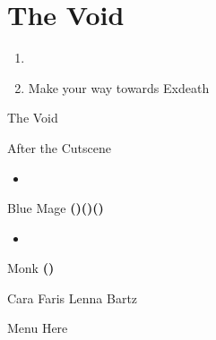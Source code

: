 \chapter{The Void}

\vspace{\baselineskip}

\begin{paracol}{2}

\begin{enumerate}
    \item {}
    \item Make your way towards Exdeath
\end{enumerate}

\switchcolumn
\begin{steproute}{The Void}
\end{steproute}

\switchcolumn*
\begin{menu}{After the Cutscene}
	\varwb
    \begin{abilityMenu}
        \bartz \ability{!\gilToss} \optimize
        \lenna \ability{!\cover} 
        \begin{itemize}
            \item[] \equip{\knife, \crystalShield}
        \end{itemize}
    \end{abilityMenu}
    \begin{jobMenu}
        \faris Blue Mage \textbf{(\pointDown)(\pointLeft)(\pointDown)} \ability{\combine} 
        \begin{itemize}
            \item[] \equip{\runningShoes}
        \end{itemize} 
        \cara Monk \textbf{(\pointRight)} \ability{!\gilToss} \optimize
    \end{jobMenu}
    \begin{rowMenu}
        \swap Cara \switch Faris
        \swap Lenna \switch Bartz
    \end{rowMenu}
    \varwe
\end{menu}

\switchcolumn
\begin{misc}{Menu Here}
\end{misc}


\end{paracol}

